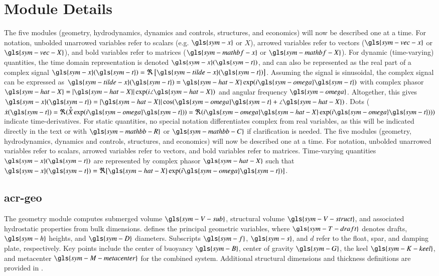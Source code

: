 \section{Module Details}
\label{sec:modules}
\ifdefined\DISSERTATION
    The five modules (geometry, hydrodynamics, dynamics and controls, structures, and economics) will now be described one at a time.
    For notation, unbolded unarrowed variables refer to scalars (e.g. $\gls{sym-x}$ or $X$), arrowed variables refer to vectors ($\gls{sym-vec-x}$ or $\gls{sym-vec-X}$), and bold variables refer to matrices ($\gls{sym-mathbf-x}$ or $\gls{sym-mathbf-X}$).
    For dynamic (time-varying) quantities, the time domain representation is denoted $\gls{sym-x}(\gls{sym-t})$, and can also be represented as the real part of a complex signal $\gls{sym-x}(\gls{sym-t})=\Re\left[\gls{sym-tilde-x}(\gls{sym-t})\right]$.
    Assuming the signal is sinusoidal, the complex signal can be expressed as $\gls{sym-tilde-x}(\gls{sym-t})=\gls{sym-hat-X}\exp(i\gls{sym-omega} \gls{sym-t})$ with complex phasor $\gls{sym-hat-X}=|\gls{sym-hat-X}|\exp(i\angle \gls{sym-hat-X})$ and angular frequency $\gls{sym-omega}$.
    Altogether, this gives $\gls{sym-x}(\gls{sym-t})=|\gls{sym-hat-X}|\cos(\gls{sym-omega} \gls{sym-t}+\angle\gls{sym-hat-X})$.
    Dots ($\dot{x}(\gls{sym-t})=\Re(\hat{\dot{X}}\exp(i\gls{sym-omega} \gls{sym-t}))=\Re(i\gls{sym-omega}\gls{sym-hat-X}\exp(i\gls{sym-omega} \gls{sym-t})))$ indicate time-derivatives.
    For static quantities, no special notation differentiates complex from real variables, as this will be indicated directly in the text or with $\gls{sym-mathbb-R}$ or $\gls{sym-mathbb-C}$ if clarification is needed.
\else
    The five modules (geometry, hydrodynamics, dynamics and controls, structures, and economics) will now be described one at a time.
    For notation, unbolded unarrowed variables refer to scalars, arrowed variables refer to vectors, and bold variables refer to matrices.
    Time-varying quantities $\gls{sym-x}(\gls{sym-t})$ are represented by complex phasor $\gls{sym-hat-X}$ such that $\gls{sym-x}(\gls{sym-t})=\Re[\gls{sym-hat-X}\exp(i\gls{sym-omega} \gls{sym-t})]$.
\fi
\subsection{\gls{acr-geo}}\label{sec:geom}
The geometry module computes submerged volume $\gls{sym-V-sub}$, structural volume $\gls{sym-V-struct}$, and associated hydrostatic properties from bulk dimensions.
 defines the principal geometric variables, where $\gls{sym-T-draft}$ denotes drafts, $\gls{sym-h}$ heights, and $\gls{sym-D}$ diameters.
Subscripts $\gls{sym-f}$, $\gls{sym-s}$, and $d$ refer to the float, spar, and damping plate, respectively.
Key points include the center of buoyancy $\gls{sym-B}$, center of gravity $\gls{sym-G}$, the keel $\gls{sym-K-keel}$, and metacenter $\gls{sym-M-metacenter}$ for the combined system.
Additional structural dimensions and thickness definitions are provided in .

